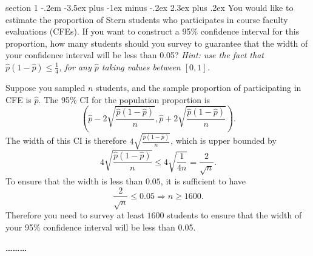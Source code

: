 \documentclass[answers,11pt]{exam}
\makeatletter
\newcommand{\h}{\widehat}
\newenvironment{problem}{\@startsection
       {section}
       {1}
       {-.2em}
       {-3.5ex plus -1ex minus -.2ex}
       {2.3ex plus .2ex}
       {\pagebreak[3]%
       \large\bf\noindent{Problem }
       }
       }
       {%
       \begin{center}\large\bf \ldots\ldots\ldots\end{center}}
\makeatother
\begin{document}
\begin{problem}{}
    You would like to estimate the proportion of Stern students who participates in course faculty evaluations (CFEs). 
    If you want to construct a 95\% confidence interval for this proportion, how many students should you survey 
    to guarantee that the width of your confidence interval will be less than 0.05?
    \textit{Hint: use the fact that $\h p (1-\h p) \leq \frac{1}{4}$, for any $\h p$ taking values between $[0,1]$.}

    \begin{solution}
        Suppose you sampled $n$ students, and the sample proportion of participating in CFE is $\h p$. 
        The 95\% CI for the population proportion is 
        \[
            \left(\h p -2\sqrt{\frac{\h p(1-\h p)}{n}}, 
            \h p +2\sqrt{\frac{\h p(1-\h p)}{n}}\right).
        \]
        The width of this CI is therefore $4 \sqrt{\frac{\h p(1-\h p)}{n}}$, which is upper bounded by
        \[
            4 \sqrt{\frac{\h p(1-\h p)}{n}} \leq 4 \sqrt{\frac{1}{4n}} = \frac{2}{\sqrt{n}} .
        \]
        To ensure that the width is less than $0.05$, 
        it is sufficient to have 
        \[
            \frac{2}{\sqrt{n}} \leq 0.05 \Rightarrow n \geq 1600. 
        \]
        Therefore you need to survey at least $1600$ students to ensure that 
        the width of your 95\% confidence interval will be less than 0.05. 
    \end{solution}

\end{problem}
\end{document}
